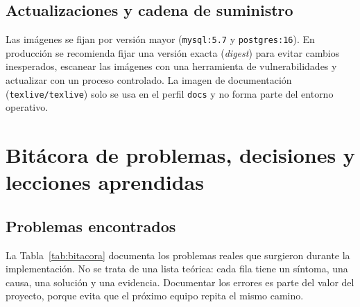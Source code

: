 \subsection{Actualizaciones y cadena de suministro}

Las imágenes se fijan por versión mayor (\texttt{mysql:5.7} y
\texttt{postgres:16}). En producción se recomienda fijar una versión exacta
(\emph{digest}) para evitar cambios inesperados, escanear las imágenes con una
herramienta de vulnerabilidades y actualizar con un proceso controlado. La
imagen de documentación (\texttt{texlive/texlive}) solo se usa en el perfil
\texttt{docs} y no forma parte del entorno operativo.

\section{Bitácora de problemas, decisiones y lecciones aprendidas}
\label{sec:bitacora}

\subsection{Problemas encontrados}

La Tabla~\ref{tab:bitacora} documenta los problemas reales que surgieron
durante la implementación. No se trata de una lista teórica: cada fila tiene
un síntoma, una causa, una solución y una evidencia. Documentar los errores es
parte del valor del proyecto, porque evita que el próximo equipo repita el
mismo camino.

